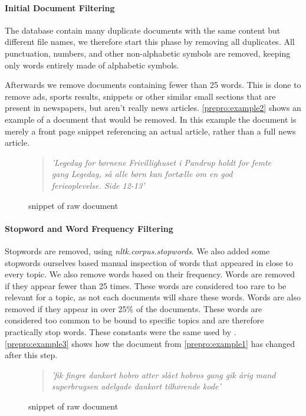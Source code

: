 \paragraph{Initial Document Filtering}
The database contain many duplicate documents with the same content but different file names, we therefore start this phase by removing all duplicates.
All punctuation, numbers, and other non-alphabetic symbols are removed, keeping only words entirely made of alphabetic symbols.

Afterwards we remove documents containing fewer than 25 words.
This is done to remove ads, sports results, snippets or other similar small sections that are present in newspapers, but aren't really news articles.
\autoref{prepro:example2} shows an example of a document that would be removed. In this example the document is merely a front page snippet referencing an actual article, rather than a full news article.
\begin{figure}[h]
	\begin{quote}
		\textit{
			'Legedag for børnene Frivillighuset i Pandrup holdt for femte gang Legedag, så alle børn kan fortælle om en god ferieoplevelse. Side 12-13'
		}
	\end{quote}
	\caption{snippet of raw document}
	\label{prepro:example2}
\end{figure}


\paragraph{Stopword and Word Frequency Filtering}
Stopwords are removed, using \emph{nltk.corpus.stopwords}. We also added some stopwords ourselves based manual inspection of words that appeared in close to every topic.
We also remove words based on their frequency. 
Words are removed if they appear fewer than 25 times.
These words are considered too rare to be relevant for a topic, as not each documents will share these words.
Words are also removed if they appear in over 25\% of the documents.
These words are considered too common to be bound to specific topics and are therefore practically stop words.
These constants were the same used by \cite{quanti}.
\autoref{prepro:example3} shows how the document from \autoref{prepro:example1} has changed after this step.
\begin{figure}[h]
	\begin{quote}
		\textit{
			'fik fingre dankort hobro atter slået hobros gang gik årig mand superbrugsen adelgade dankort tilhørende kode'
		}
	\end{quote}
	\caption{snippet of raw document}
	\label{prepro:example3}
\end{figure}


